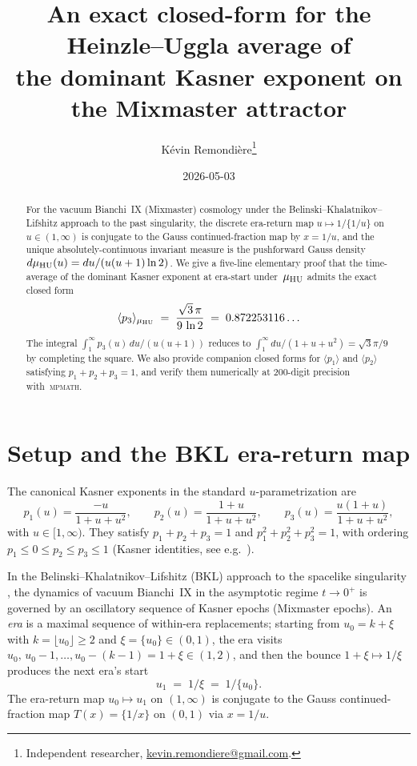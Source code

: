 \documentclass[11pt,a4paper]{article}
\title{An exact closed-form for the Heinzle--Uggla average of\\
       the dominant Kasner exponent on the Mixmaster attractor}
\author{Kévin Remondière\thanks{Independent researcher, \href{mailto:kevin.remondiere@gmail.com}{kevin.remondiere@gmail.com}.}}
\date{2026-05-03}
\begin{document}
\maketitle

\begin{abstract}
For the vacuum Bianchi~IX (Mixmaster) cosmology under the Belinski--Khalatnikov--%
Lifshitz approach to the past singularity, the discrete era-return map
$u\mapsto 1/\{1/u\}$ on $u\in(1,\infty)$ is conjugate to the Gauss
continued-fraction map by $x=1/u$, and the unique absolutely-continuous invariant
measure is the pushforward Gauss density $d\mu_{\rm HU}(u)=du/(u(u+1)\ln 2)$.
We give a five-line elementary proof that the time-average of the dominant Kasner
exponent at era-start under~$\mu_{\rm HU}$ admits the exact closed form
\[
   \langle p_3\rangle_{\mu_{\rm HU}}
   \;=\;\frac{\sqrt{3}\,\pi}{9\,\ln 2}
   \;=\;0.872253116\ldots
\]
The integral $\int_1^\infty p_3(u)\,du/(u(u+1))$ reduces to $\int_1^\infty
du/(1+u+u^2)=\sqrt{3}\pi/9$ by completing the square. We also provide
companion closed forms for $\langle p_1\rangle$ and $\langle p_2\rangle$
satisfying $p_1+p_2+p_3=1$, and verify them numerically at $200$-digit
precision with~\textsc{mpmath}.
\end{abstract}

\section{Setup and the BKL era-return map}
\label{sec:setup}

The canonical Kasner exponents in the standard $u$-parametrization are
\begin{equation}
  p_1(u)=\frac{-u}{1+u+u^2},\qquad
  p_2(u)=\frac{1+u}{1+u+u^2},\qquad
  p_3(u)=\frac{u(1+u)}{1+u+u^2},
\label{eq:kasner}
\end{equation}
with $u\in[1,\infty)$.  They satisfy
$p_1+p_2+p_3=1$ and $p_1^2+p_2^2+p_3^2=1$, with ordering
$p_1\le 0\le p_2\le p_3\le 1$ (Kasner identities, see e.g.\
\cite{Wainwright1997,LandauLifshitz1980}).

In the Belinski--Khalatnikov--Lifshitz (BKL) approach to the spacelike
singularity \cite{BKL1970,LandauLifshitz1980}, the dynamics of vacuum
Bianchi~IX in the asymptotic regime $t\to 0^+$ is governed by an oscillatory
sequence of Kasner epochs (Mixmaster epochs).  An \emph{era} is a maximal
sequence of within-era replacements; starting from $u_0=k+\xi$ with
$k=\lfloor u_0\rfloor\ge 2$ and $\xi=\{u_0\}\in(0,1)$, the era visits
$u_0,\,u_0-1,\ldots,u_0-(k-1)=1+\xi\in(1,2)$, and then the bounce
$1+\xi\mapsto 1/\xi$ produces the next era's start
\begin{equation}
  u_1\;=\;1/\xi\;=\;1/\{u_0\}.
\label{eq:erareturn}
\end{equation}
The era-return map $u_0\mapsto u_1$ on $(1,\infty)$ is conjugate
to the Gauss continued-fraction map $T(x)=\{1/x\}$ on $(0,1)$
via $x=1/u$.
\end{document}
